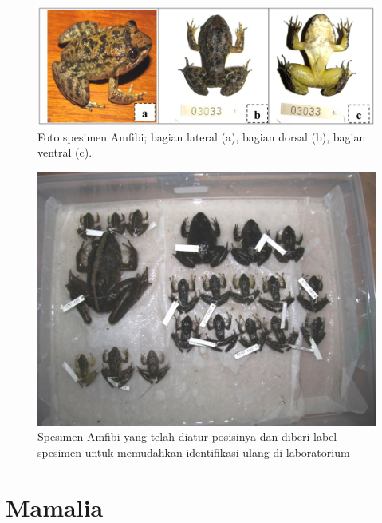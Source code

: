 \documentclass[
  oneside]{book}
\begin{document}
\begin{figure}

{\centering \includegraphics[width=1\linewidth]{images/spesimenafmibi1} 

}

\caption{Foto spesimen Amfibi; bagian lateral (a), bagian dorsal (b), bagian ventral (c).}\label{fig:spesamf1}
\end{figure}

\begin{figure}

{\centering \includegraphics[width=1\linewidth]{images/spesimenafmibi2} 

}

\caption{Spesimen Amfibi yang telah diatur posisinya dan diberi label spesimen untuk memudahkan identifikasi ulang di laboratorium}\label{fig:spesamf2}
\end{figure}

\hypertarget{mamalia-1}{%
\section*{Mamalia}\label{mamalia-1}}
\end{document}
